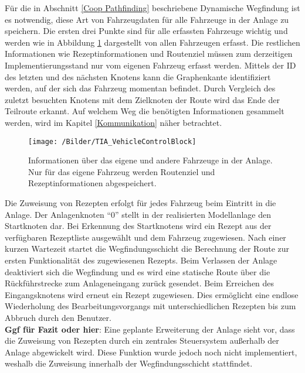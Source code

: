 			Für die in Abschnitt \ref{Coop Pathfinding} beschriebene Dynamische Wegfindung ist es notwendig, diese Art von Fahrzeugdaten für alle Fahrzeuge in der Anlage zu speichern. Die ersten drei Punkte sind für alle erfassten Fahrzeuge wichtig und werden wie in Abbildung \ref{VehicleControlBlock} dargestellt von allen Fahrzeugen erfasst. Die restlichen Informationen wie Rezeptinformationen und Routenziel müssen zum derzeitigen Implementierungsstand nur vom eigenen Fahrzeug erfasst werden. Mittels der ID des letzten und des nächsten Knotens kann die Graphenkante identifiziert werden, auf der sich das Fahrzeug momentan befindet. Durch Vergleich des zuletzt besuchten Knotens mit dem Zielknoten der Route wird das Ende der Teilroute erkannt. Auf welchem Weg die benötigten Informationen gesammelt werden, wird im  Kapitel \ref{Kommunikation} näher betrachtet.
			
			\begin{figure}[h]
				\centering
				\texttt{[image: /Bilder/TIA\_VehicleControlBlock]}
				\vspace{0.2cm}
				\caption{Informationen über das eigene und andere Fahrzeuge in der Anlage. Nur für das eigene Fahrzeug werden Routenziel und Rezeptinformationen abgespeichert.}\label{VehicleControlBlock}
			\end{figure}
			Die Zuweisung von Rezepten erfolgt für jedes Fahrzeug beim Eintritt in die Anlage. Der Anlagenknoten "`0"' stellt in der realisierten Modellanlage den Startknoten dar. Bei Erkennung des Startknotens wird ein Rezept aus der verfügbaren Rezeptliste ausgewählt und dem Fahrzeug zugewiesen. Nach einer kurzen Wartezeit startet die Wegfindungsschicht die Berechnung der Route zur ersten Funktionalität des zugewiesenen Rezepts. Beim Verlassen der Anlage deaktiviert sich die Wegfindung und es wird eine statische Route über die Rückführstrecke zum Anlageneingang zurück gesendet. Beim Erreichen des Eingangsknotens wird erneut ein Rezept zugewiesen. Dies ermöglicht eine endlose Wiederholung des Bearbeitungsvorgangs  mit unterschiedlichen Rezepten bis zum Abbruch durch den Benutzer.
			\\[4pt]
			\textbf{Ggf für Fazit oder hier}: Eine geplante Erweiterung der Anlage sieht vor, dass die Zuweisung von Rezepten durch ein zentrales Steuersystem außerhalb der Anlage abgewickelt wird. Diese Funktion wurde jedoch noch nicht implementiert, weshalb die Zuweisung innerhalb der Wegfindungsschicht stattfindet.
			
		
